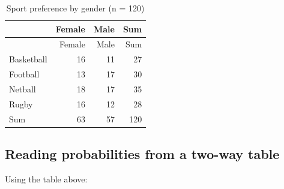 \documentclass[
  11pt,
  a4paper,
  oneside,
  open=any]{scrbook}
\begin{document}
\begin{longtable}[]{@{}lrrr@{}}
\caption{Sport preference by gender (n = 120)}\tabularnewline
\toprule\noalign{}
& Female & Male & Sum \\
\midrule\noalign{}
\endfirsthead
\toprule\noalign{}
& Female & Male & Sum \\
\midrule\noalign{}
\endhead
\bottomrule\noalign{}
\endlastfoot
Basketball & 16 & 11 & 27 \\
Football & 13 & 17 & 30 \\
Netball & 18 & 17 & 35 \\
Rugby & 16 & 12 & 28 \\
Sum & 63 & 57 & 120 \\
\end{longtable}

\subsection{Reading probabilities from a two-way
table}\label{reading-probabilities-from-a-two-way-table}

Using the table above:
\end{document}

